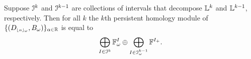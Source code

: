 \begin{lemma}\label{lem:decomposition}
  Suppose $\mathcal{I}^k$ and $\mathcal{I}^{k-1}$ are collections of intervals that decompose $\mathbb{L}^k$ and $\mathbb{L}^{k-1}$, respectively.
  Then for all $k$ the $k$th persistent homology module of $\{(D_{\scriptscriptstyle \lfloor\alpha\rfloor_{\omega}}, B_\omega)\}_{\alpha\in\mathbb{R}}$ is equal to
  \[\bigoplus_{I\in\mathcal{I}^k} \mathbb{F}_\omega^I \oplus \bigoplus_{I\in \mathcal{I}_\omega^{k-1}} \mathbb{F}^{I_+}.\]
\end{lemma}
%
%
